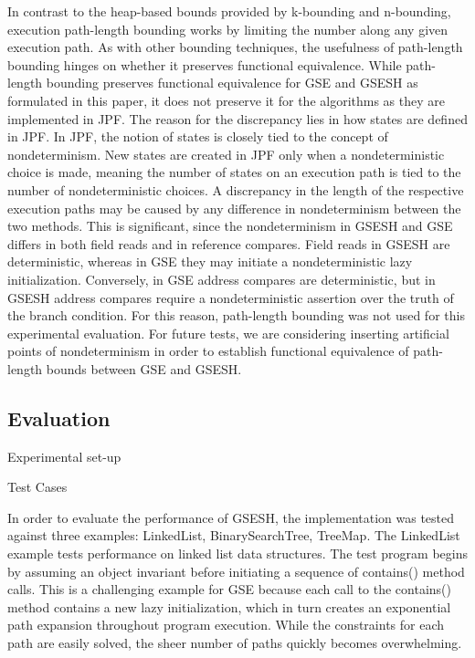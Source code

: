 In contrast to the heap-based bounds provided by k-bounding and n-bounding, execution path-length bounding works by limiting the number along any given execution path. As with other bounding techniques, the usefulness of path-length bounding hinges on whether it preserves functional equivalence. While path-length bounding preserves functional equivalence for GSE and GSESH as formulated in this paper, it does not preserve it for the algorithms as they are implemented in JPF. The reason for the discrepancy lies in how states are defined in JPF. In JPF, the notion of states is closely tied to the concept of nondeterminism. New states are created in JPF only when a nondeterministic choice is made, meaning the number of states on an execution path is tied to the number of nondeterministic choices. A discrepancy in the length of the respective execution paths may be caused by any difference in nondeterminism between the two methods. This is significant, since the nondeterminism in GSESH and GSE differs in both field reads and in reference compares. Field reads in GSESH are deterministic, whereas in GSE they may initiate a nondeterministic lazy initialization. Conversely, in GSE address compares are deterministic, but in GSESH address compares require a nondeterministic assertion over the truth of the branch condition. For this reason, path-length bounding was not used for this experimental evaluation. For future tests, we are considering inserting artificial points of nondeterminism in order to establish functional equivalence of path-length bounds between GSE and GSESH. 

\subsection{Evaluation} 
Experimental set-up

Test Cases

In order to evaluate the performance of GSESH, the implementation was tested against three examples: LinkedList, BinarySearchTree, TreeMap.
The LinkedList example tests performance on linked list data structures. The test program begins by assuming an object invariant before initiating a sequence of contains() method calls. This is a challenging example for GSE because each call to the contains() method contains a new lazy initialization, which in turn creates an exponential path expansion throughout program execution. While the constraints for each path are easily solved, the sheer number of paths quickly becomes overwhelming.

